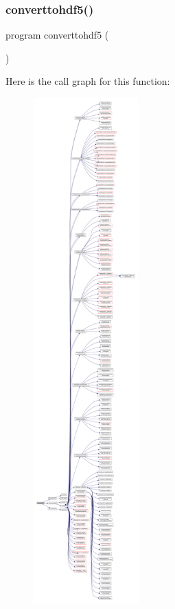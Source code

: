 \subsubsection{\texorpdfstring{converttohdf5()}{converttohdf5()}}
{\footnotesize\ttfamily program converttohdf5 (\begin{DoxyParamCaption}{ }\end{DoxyParamCaption})}

Here is the call graph for this function\+:\nopagebreak
\begin{figure}[H]
\begin{center}
\leavevmode
\includegraphics[height=550pt]{_convert_to_h_d_f5_8_f90_aadfe1d94209a839bcb931b2d15d0d814_cgraph}
\end{center}
\end{figure}
\mbox{\label{_convert_to_h_d_f5_8_f90_ae1cc4187af20917b66ab29a90f402338}} 
